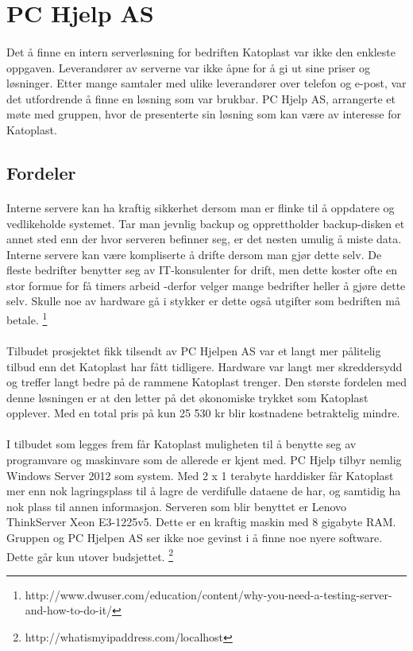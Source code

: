 \section{PC Hjelp AS}
\paragraph{} Det å finne en intern serverløsning for bedriften Katoplast var ikke den enkleste oppgaven. Leverandører av serverne var ikke åpne for å gi ut sine priser og løsninger. Etter mange samtaler med ulike leverandører over telefon og e-post, var det utfordrende å finne en løsning som var brukbar. PC Hjelp AS, arrangerte et møte med gruppen, hvor de presenterte sin løsning som kan være av interesse for Katoplast. 
\subsection{Fordeler}

\paragraph{} Interne servere kan ha kraftig sikkerhet dersom man er flinke til å oppdatere og vedlikeholde systemet. Tar man jevnlig backup og opprettholder backup-disken et annet sted enn der hvor serveren befinner seg, er det nesten umulig å miste data. Interne servere kan være kompliserte å drifte dersom man gjør dette selv. De fleste bedrifter benytter seg av IT-konsulenter for drift, men dette koster ofte en stor formue for få timers arbeid -derfor velger mange bedrifter heller å gjøre dette selv. Skulle noe av hardware gå i stykker er dette også utgifter som bedriften må betale.
\footnote{http://www.dwuser.com/education/content/why-you-need-a-testing-server-and-how-to-do-it/}


\paragraph{} Tilbudet prosjektet fikk tilsendt av PC Hjelpen AS var et langt mer pålitelig tilbud enn det Katoplast har fått tidligere. Hardware var langt mer skreddersydd og treffer langt bedre på de rammene Katoplast trenger. Den største fordelen med denne løsningen er at den letter på det økonomiske trykket som Katoplast opplever. Med en total pris på kun 25 530 kr blir kostnadene betraktelig mindre.

\paragraph{} I tilbudet som legges frem får Katoplast muligheten til å benytte seg av programvare og maskinvare som de allerede er kjent med. PC Hjelp tilbyr nemlig Windows Server 2012 som system. Med 2 x 1 terabyte harddisker får Katoplast mer enn nok lagringsplass til å lagre de verdifulle dataene de har, og samtidig ha nok plass til annen informasjon. Serveren som blir benyttet er Lenovo ThinkServer Xeon E3-1225v5. Dette er en kraftig maskin med 8 gigabyte RAM. Gruppen og PC Hjelpen AS ser ikke noe gevinst i å finne noe nyere software. Dette går kun utover budsjettet. 
\footnote{http://whatismyipaddress.com/localhost}

